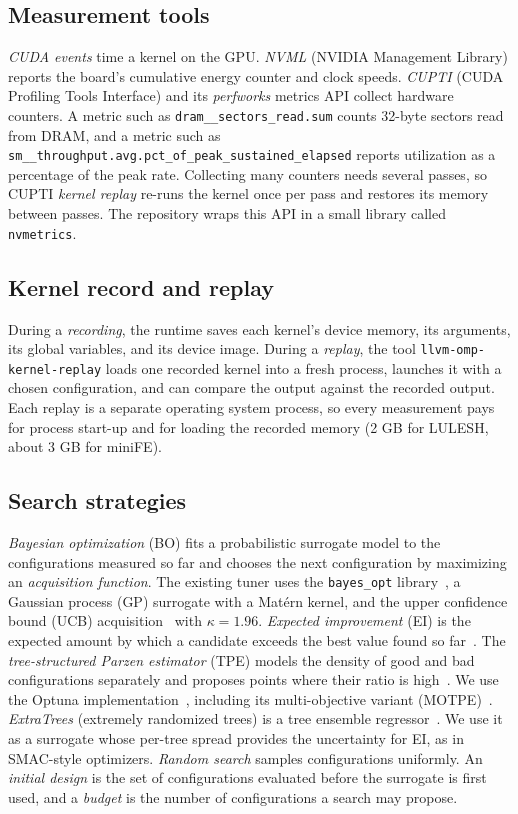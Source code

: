 \documentclass[10pt]{article}
\newcommand{\code}[1]{\texttt{#1}}
\begin{document}
\subsection{Measurement tools}
\emph{CUDA events} time a kernel on the GPU. \emph{NVML} (NVIDIA Management
Library) reports the board's cumulative energy counter and clock speeds.
\emph{CUPTI} (CUDA Profiling Tools Interface) and its \emph{perfworks}
metrics API collect hardware counters. A metric such as
\code{dram\_\_sectors\_read.sum} counts 32-byte sectors read from DRAM, and a
metric such as \code{sm\_\_throughput.avg.pct\_of\_peak\_sustained\_elapsed}
reports utilization as a percentage of the peak rate. Collecting many
counters needs several passes, so CUPTI \emph{kernel replay} re-runs the
kernel once per pass and restores its memory between passes. The repository
wraps this API in a small library called \code{nvmetrics}.

\subsection{Kernel record and replay}
During a \emph{recording}, the runtime saves each kernel's device memory, its
arguments, its global variables, and its device image. During a
\emph{replay}, the tool \code{llvm-omp-kernel-replay} loads one recorded
kernel into a fresh process, launches it with a chosen configuration, and can
compare the output against the recorded output. Each replay is a separate
operating system process, so every measurement pays for process start-up and
for loading the recorded memory (2 GB for LULESH, about 3 GB for miniFE).

\subsection{Search strategies}
\emph{Bayesian optimization} (BO) fits a probabilistic surrogate model to the
configurations measured so far and chooses the next configuration by
maximizing an \emph{acquisition function}. The existing tuner uses the
\code{bayes\_opt} library~\cite{nogueira2014bayesopt}, a Gaussian process
(GP) surrogate with a Mat\'ern kernel, and the upper confidence bound (UCB)
acquisition~\cite{srinivas2010gpucb} with $\kappa = 1.96$. \emph{Expected
improvement} (EI) is the expected amount by which a candidate exceeds the
best value found so far~\cite{jones1998ego}. The \emph{tree-structured Parzen
estimator} (TPE) models the density of good and bad configurations separately
and proposes points where their ratio is high~\cite{bergstra2011tpe}. We use
the Optuna implementation~\cite{akiba2019optuna}, including its
multi-objective variant (MOTPE)~\cite{ozaki2022motpe}. \emph{ExtraTrees}
(extremely randomized trees) is a tree ensemble regressor~\cite{geurts2006extratrees}.
We use it as a surrogate whose per-tree spread provides the uncertainty for
EI, as in SMAC-style optimizers. \emph{Random search} samples configurations
uniformly. An \emph{initial design} is the set of configurations evaluated
before the surrogate is first used, and a \emph{budget} is the number of
configurations a search may propose.
\end{document}
